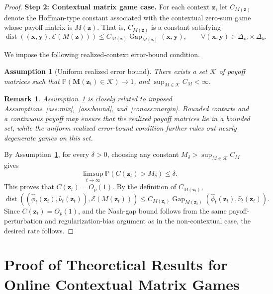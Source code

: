 \documentclass[12pt]{article}
\newtheorem{assumption}{Assumption}[section]
\newtheorem{remark}{Remark}
\begin{document}
\begin{proof}
\textbf{Step 2: Contextual matrix game case.}
For each context $\bm z$, let $C_{M(\bm z)}$ denote the Hoffman-type constant associated with the contextual zero-sum game whose payoff matrix is $M(\bm z)$. That is, $C_{M(\bm z)}$ is a constant satisfying
\[
\operatorname{dist}
\left(
(\bm x,\bm y),
\mathcal E(M(\bm z))
\right)
\le
C_{M(\bm z)}
\operatorname{Gap}_{M(\bm z)}(\bm x,\bm y),
\qquad
\forall(\bm x,\bm y)\in\Delta_m\times\Delta_k .
\]

We impose the following realized-context error-bound condition.

\begin{assumption}[Uniform realized error bound]
\label{conass:uniform_realized_error_bound}
There exists a set $\mathcal K$ of payoff matrices such that $\mathbb P\left(
\bm M(\bm z_t)\in\mathcal K
\right)
\to 1$,
and $\sup_{M\in\mathcal K} C_{M}<\infty$.
\end{assumption}
\begin{remark}
Assumption~\ref{conass:uniform_realized_error_bound} is closely related to imposed Assumptions~\ref{ass:mix},~\ref{ass:bound},  and~\ref{conass:margin}. Bounded contexts and a continuous payoff map ensure that the realized payoff matrices lie in a bounded set, while the uniform realized error-bound condition further rules out nearly degenerate games on this set.
\end{remark}

By Assumption~\ref{conass:uniform_realized_error_bound}, for every $\delta>0$, choosing any constant $M_\delta>\sup_{M\in\mathcal K} C_{M}$ gives
\[
\limsup_{t\to\infty}
\mathbb P\left(
C(\bm z_t)>M_\delta
\right)
\le \delta.
\]
This proves that $C(\bm z_t)=O_p(1)$. By the definition of $C_{M(\bm z_t)}$,
\[
\operatorname{dist}
\left(
(
\widehat\phi_t(\bm z_t),
\widehat\nu_t(\bm z_t)
),
\mathcal E(M(\bm z_t))
\right)
\le
C_{M(\bm z_t)}
\operatorname{Gap}_{M(\bm z_t)}
\left(
\widehat\phi_t(\bm z_t),
\widehat\nu_t(\bm z_t)
\right).
\]
Since $C(\bm z_t)=O_p(1)$, and the Nash-gap bound follows from the same payoff-perturbation and regularization-bias argument as in the non-contextual
case, the desired rate follows.
\end{proof}



\section{Proof of Theoretical Results for Online Contextual Matrix Games}
\label{app:proof_context}
\end{document}
